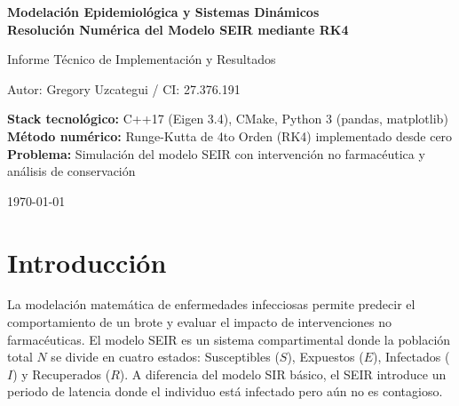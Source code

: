 \documentclass[12pt,a4paper]{article}
\theoremstyle{definition}
\begin{document}
\begin{titlepage}
    \centering
    \vspace*{2cm}
    {\Huge\bfseries Modelaci\'{o}n Epidemiol\'{o}gica y Sistemas Din\'{a}micos\\[0.3cm] Resoluci\'{o}n Num\'{e}rica del Modelo SEIR mediante RK4\par}
    \vspace{1.5cm}
    {\Large Informe T\'{e}cnico de Implementaci\'{o}n y Resultados\par}
    \vspace{2cm}
    {\Large Autor: Gregory Uzcategui / CI: 27.376.191 \par}
    \vspace{2cm}
    {\large
    \textbf{Stack tecnol\'{o}gico:} C++17 (Eigen 3.4), CMake, Python 3 (pandas, matplotlib)\\[0.5cm]
    \textbf{M\'{e}todo num\'{e}rico:} Runge-Kutta de 4to Orden (RK4) implementado desde cero\\[0.5cm]
    \textbf{Problema:} Simulaci\'{o}n del modelo SEIR con intervenci\'{o}n no farmac\'{e}utica y an\'{a}lisis de conservaci\'{o}n
    \par}
    \vfill
    {\large \today\par}
\end{titlepage}

\begin{abstract}
\noindent
La implementaci\'{o}n de un solver num\'{e}rico para el modelo epidemiol\'{o}gico compartimental SEIR. Se desarroll\'{o} el algoritmo de Runge-Kutta de 4to orden (RK4) \textbf{desde cero} en C++17, utilizando la librer\'{i}a Eigen para la manipulaci\'{o}n eficiente de vectores de estado. Se evaluaron dos escenarios: uno libre ($\beta = 0.6$) y otro con intervenci\'{o}n de confinamiento ($\beta$ se reduce a $0.25$ en $t=30$). 
\end{abstract}

\tableofcontents
\newpage

\section{Introducci\'{o}n}\label{sec:intro}

La modelaci\'{o}n matem\'{a}tica de enfermedades infecciosas permite predecir el comportamiento de un brote y evaluar el impacto de intervenciones no farmac\'{e}uticas. El modelo SEIR es un sistema compartimental donde la poblaci\'{o}n total $N$ se divide en cuatro estados: Susceptibles ($S$), Expuestos ($E$), Infectados ($I$) y Recuperados ($R$). A diferencia del modelo SIR b\'{a}sico, el SEIR introduce un periodo de latencia donde el individuo est\'{a} infectado pero a\'{u}n no es contagioso.
\end{document}

